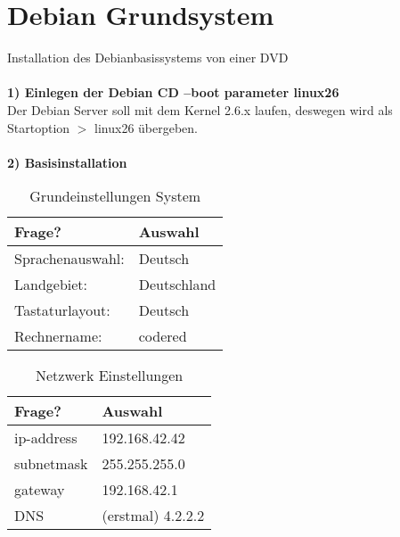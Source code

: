\section{Debian Grundsystem}
\label{section:Debian Grundsystem}
Installation des Debianbasissystems von einer DVD \\
\\
\textbf{1) Einlegen der Debian CD --boot parameter \glqq linux26\grqq} \\
Der Debian Server soll mit dem Kernel 2.6.x laufen, deswegen wird als Startoption $>$ linux26 übergeben. \\
\\
\textbf{2) Basisinstallation}
\begin{table}[htbp]
\begin{center}
\begin{tabular*}{0.95\textwidth}{p{}p{}}
\hline
\textbf{Frage?} & \textbf{Auswahl} \\
\hline
Sprachenauswahl: & Deutsch \\
Landgebiet: & Deutschland \\
Tastaturlayout: & Deutsch \\
Rechnername: & codered \\
\hline
\end{tabular*}
\caption{Grundeinstellungen System}
\label{table:Grundeinstellungen System}
\end{center}
\end{table}
\begin{table}[htbp]
\begin{center}
\begin{tabular*}{0.95\textwidth}{p{}p{}}
\hline
\textbf{Frage?} & \textbf{Auswahl} \\
\hline
ip-address & 192.168.42.42 \\
subnetmask & 255.255.255.0 \\
gateway & 192.168.42.1 \\
DNS & (erstmal) 4.2.2.2 \\
\hline
\end{tabular*}
\caption{Netzwerk Einstellungen}
\label{table:Netzwerk Einstellungen}
\end{center}
\end{table}

